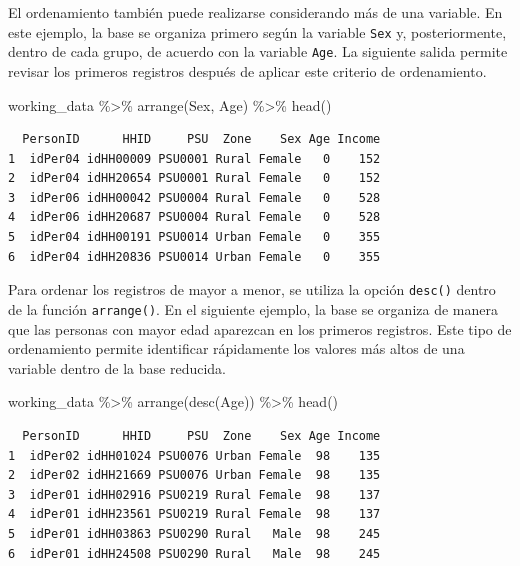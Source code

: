 \documentclass[
  spanish,
  11pt,
  letterpaper,
  oneside,
  open=any]{scrbook}
\newenvironment{Shaded}{\begin{snugshade}}{\end{snugshade}}
\newcommand{\FunctionTok}[1]{\textcolor[rgb]{0.28,0.35,0.67}{#1}}
\newcommand{\NormalTok}[1]{\textcolor[rgb]{0.00,0.23,0.31}{#1}}
\newcommand{\SpecialCharTok}[1]{\textcolor[rgb]{0.37,0.37,0.37}{#1}}
\begin{document}
El ordenamiento también puede realizarse considerando más de una
variable. En este ejemplo, la base se organiza primero según la variable
\texttt{Sex} y, posteriormente, dentro de cada grupo, de acuerdo con la
variable \texttt{Age}. La siguiente salida permite revisar los primeros
registros después de aplicar este criterio de ordenamiento.

\begin{Shaded}
\begin{Highlighting}[]
\NormalTok{working\_data }\SpecialCharTok{\%\textgreater{}\%}
  \FunctionTok{arrange}\NormalTok{(Sex, Age) }\SpecialCharTok{\%\textgreater{}\%}
  \FunctionTok{head}\NormalTok{()}
\end{Highlighting}
\end{Shaded}

\begin{verbatim}
  PersonID      HHID     PSU  Zone    Sex Age Income
1  idPer04 idHH00009 PSU0001 Rural Female   0    152
2  idPer04 idHH20654 PSU0001 Rural Female   0    152
3  idPer06 idHH00042 PSU0004 Rural Female   0    528
4  idPer06 idHH20687 PSU0004 Rural Female   0    528
5  idPer04 idHH00191 PSU0014 Urban Female   0    355
6  idPer04 idHH20836 PSU0014 Urban Female   0    355
\end{verbatim}

Para ordenar los registros de mayor a menor, se utiliza la opción
\texttt{desc()} dentro de la función \texttt{arrange()}. En el siguiente
ejemplo, la base se organiza de manera que las personas con mayor edad
aparezcan en los primeros registros. Este tipo de ordenamiento permite
identificar rápidamente los valores más altos de una variable dentro de
la base reducida.

\begin{Shaded}
\begin{Highlighting}[]
\NormalTok{working\_data }\SpecialCharTok{\%\textgreater{}\%}
  \FunctionTok{arrange}\NormalTok{(}\FunctionTok{desc}\NormalTok{(Age)) }\SpecialCharTok{\%\textgreater{}\%}
  \FunctionTok{head}\NormalTok{()}
\end{Highlighting}
\end{Shaded}

\begin{verbatim}
  PersonID      HHID     PSU  Zone    Sex Age Income
1  idPer02 idHH01024 PSU0076 Urban Female  98    135
2  idPer02 idHH21669 PSU0076 Urban Female  98    135
3  idPer01 idHH02916 PSU0219 Rural Female  98    137
4  idPer01 idHH23561 PSU0219 Rural Female  98    137
5  idPer01 idHH03863 PSU0290 Rural   Male  98    245
6  idPer01 idHH24508 PSU0290 Rural   Male  98    245
\end{verbatim}
\end{document}
